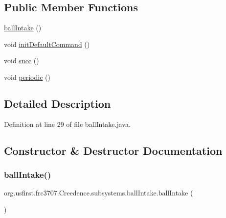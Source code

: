 \subsection*{Public Member Functions}
\begin{DoxyCompactItemize}
\item 
\mbox{\hyperlink{classorg_1_1usfirst_1_1frc3707_1_1_creedence_1_1subsystems_1_1ball_intake_a9c5ca655d80a32609b28ea517bb6b9d4}{ball\+Intake}} ()
\item 
void \mbox{\hyperlink{classorg_1_1usfirst_1_1frc3707_1_1_creedence_1_1subsystems_1_1ball_intake_a1a3b7da34eff60eaad31edab806c7c20}{init\+Default\+Command}} ()
\item 
void \mbox{\hyperlink{classorg_1_1usfirst_1_1frc3707_1_1_creedence_1_1subsystems_1_1ball_intake_af06c54b7f657477e9e028dd792c279a9}{succ}} ()
\item 
void \mbox{\hyperlink{classorg_1_1usfirst_1_1frc3707_1_1_creedence_1_1subsystems_1_1ball_intake_a949a9c1c6c62075dbd0f4f9669d0a24e}{periodic}} ()
\end{DoxyCompactItemize}


\subsection{Detailed Description}


Definition at line 29 of file ball\+Intake.\+java.



\subsection{Constructor \& Destructor Documentation}
\mbox{\label{classorg_1_1usfirst_1_1frc3707_1_1_creedence_1_1subsystems_1_1ball_intake_a9c5ca655d80a32609b28ea517bb6b9d4}} 
\subsubsection{\texorpdfstring{ballIntake()}{ballIntake()}}
{\footnotesize\ttfamily org.\+usfirst.\+frc3707.\+Creedence.\+subsystems.\+ball\+Intake.\+ball\+Intake (\begin{DoxyParamCaption}{ }\end{DoxyParamCaption})}



